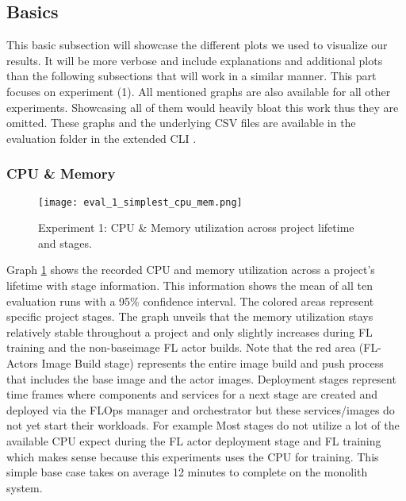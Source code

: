 \subsection{Basics}

This basic subsection will showcase the different plots we used to visualize our results.
It will be more verbose and include explanations and additional plots than the following subsections that will work in a similar manner.
This part focuses on experiment (1).
All mentioned graphs are also available for all other experiments.
Showcasing all of them would heavily bloat this work thus they are omitted.
These graphs and the underlying CSV files are available in the evaluation folder in the extended CLI \cite{cli_code}.

\subsubsection{CPU \& Memory}

\begin{figure}[h]
    \begin{adjustwidth}{-0.2\paperwidth}{-0.2\paperwidth}
        \centering
        \texttt{[image: eval\_1\_simplest\_cpu\_mem.png]}
        \caption{Experiment 1: CPU \& Memory utilization across project lifetime and stages.}
        \label{fig:eval_1_simplest_cpu_mem}
    \end{adjustwidth}
\end{figure}

Graph \ref{fig:eval_1_simplest_cpu_mem} shows the recorded CPU and memory utilization across a project's lifetime with stage information.
This information shows the mean of all ten evaluation runs with a 95\% confidence interval.
The colored areas represent specific project stages.
The graph unveils that the memory utilization stays relatively stable throughout a project and only slightly increases during FL training and the non-baseimage FL actor builds.
Note that the red area (FL-Actors Image Build stage) represents the entire image build and push process that includes the base image and the actor images.
Deployment stages represent time frames where components and services for a next stage are created and deployed via the FLOps manager and orchestrator but these services/images do not yet start their workloads.
For example
Most stages do not utilize a lot of the available CPU expect during the FL actor deployment stage and FL training which makes sense because this experiments uses the CPU for training.
This simple base case takes on average 12 minutes to complete on the monolith system.


